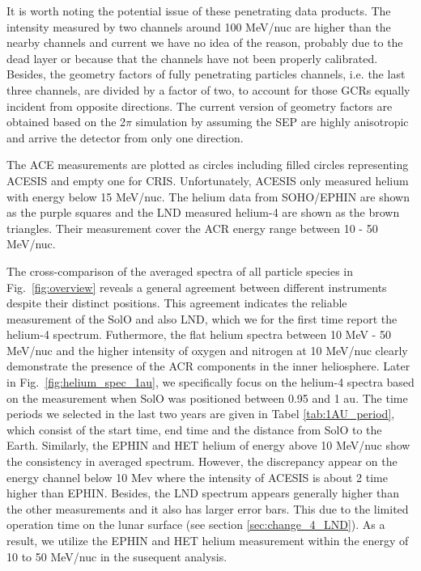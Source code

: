 It is worth noting the potential issue of these penetrating data products. The intensity measured by two channels around 100 MeV/nuc are higher than the nearby channels and current we have no idea of the reason, probably due to the dead layer or because that the channels have not been properly calibrated.
Besides, the geometry factors of fully penetrating particles channels, i.e. the last three channels, are divided by a factor of two, to account for those \acp{GCR} equally incident from opposite directions. The current version of geometry factors are obtained based on the 2$\pi$ simulation by assuming the \ac{SEP} are highly anisotropic and arrive the detector from only one direction. 

The \ac{ACE} measurements are plotted as circles including filled circles representing \ac{ACESIS} and empty one for \ac{CRIS}. Unfortunately, \ac{ACESIS} only measured helium with energy below 15 MeV/nuc.
The helium data from \ac{SOHO}/\ac{EPHIN} are shown as the purple squares and the \ac{LND} measured helium-4 are shown as the brown triangles. Their measurement cover the \ac{ACR} energy range between 10 - 50 MeV/nuc.

The cross-comparison of the averaged spectra of all particle species in Fig.~\ref{fig:overview} reveals a general agreement between different instruments despite their distinct positions. This agreement indicates the reliable measurement of the \ac{SolO} and also \ac{LND}, which we for the first time report the helium-4 spectrum. Futhermore, the flat helium spectra between 10 MeV - 50 MeV/nuc and the higher intensity of oxygen and nitrogen at 10 MeV/nuc clearly demonstrate the presence of the \ac{ACR} components in the inner heliosphere. 
Later in Fig.~\ref{fig:helium_spec_1au}, we specifically focus on the helium-4 spectra based on the measurement when \ac{SolO} was positioned between 0.95 and 1 au. The time periods we selected in the last two years are given in Tabel \ref{tab:1AU_period}, which consist of the start time, end time and the distance from \ac{SolO} to the Earth.
Similarly, the \ac{EPHIN} and \ac{HET} helium of energy above 10 MeV/nuc show  the consistency in averaged spectrum. However, the discrepancy appear on the energy channel below 10 Mev where the intensity of \ac{ACESIS} is about 2 time higher than \ac{EPHIN}. Besides, the \ac{LND} spectrum appears generally higher than the other measurements and it also has larger error bars. This due to the limited operation time on the lunar surface (see section \ref{sec:change_4_LND}). As a result, we utilize the \ac{EPHIN} and \ac{HET} helium measurement within the energy of 10 to 50 MeV/nuc in the susequent analysis.



